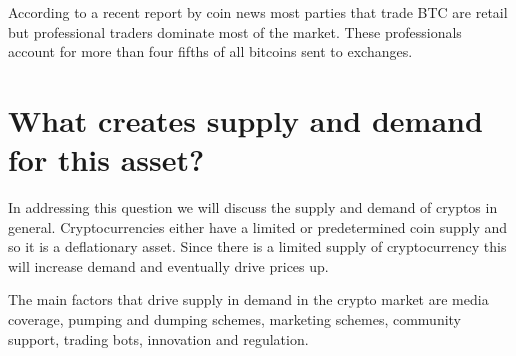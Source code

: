 According to a recent report by coin news most parties that trade BTC are retail but professional traders dominate most of the market.  These professionals account for more than four fifths of all bitcoins sent to exchanges. \cite{retail}

\section{ What creates supply and demand for this asset?}
In addressing this question we will discuss the supply and demand of cryptos in general. 
Cryptocurrencies either have a limited or predetermined coin supply and so it is a deflationary asset. Since there is a limited supply of cryptocurrency this will increase demand and eventually drive prices up.

The main factors that drive supply in demand in the crypto market are media coverage, pumping and dumping schemes, marketing schemes, community support, trading bots, innovation and regulation. \cite{sd}
